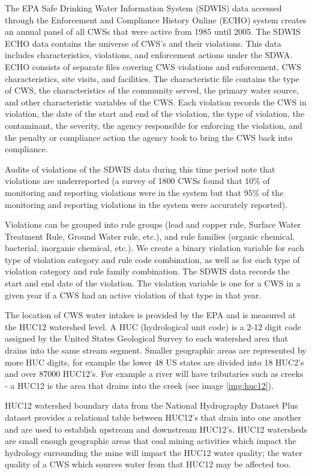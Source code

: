 \documentclass{article}
\begin{document}
The EPA Safe Drinking Water Information System (SDWIS) data accessed through the Enforcement and Compliance History Online (ECHO) system creates an annual panel of all CWSs that were active from 1985 until 2005. The SDWIS ECHO data contains the universe of CWS's and their violations. This data includes characteristics, violations, and enforcement actions under the SDWA. ECHO consists of separate files covering CWS violations and enforcement, CWS characteristics, site visits, and facilities. The characteristic file contains the type of CWS, the characteristics of the community served, the primary water source, and other characteristic variables of the CWS. Each violation records the CWS in violation, the date of the start and end of the violation, the type of violation, the contaminant, the severity, the agency responsible for enforcing the violation, and the penalty or compliance action the agency took to bring the CWS back into compliance.

Audits of violations of the SDWIS data during this time period note that violations are underreported (a survey of 1800 CWSs found that 10\% of monitoring and reporting violations were in the system but that 95\% of the monitoring and reporting violations in the system were accurately reported).

Violations can be grouped into rule groups (lead and copper rule, Surface Water Treatment Rule, Ground Water rule, etc.), and rule families (organic chemical, bacterial, inorganic chemical, etc.). We create a binary violation variable for each type of violation category and rule code combination, as well as for each type of violation category and rule family combination. The SDWIS data records the start and end date of the violation. The violation variable is one for a CWS in a given year if a CWS had an active violation of that type in that year. 

The location of CWS water intakes is provided by the EPA and is measured at the HUC12 watershed level. A HUC (hydrological unit code) is a 2-12 digit code assigned by the United States Geological Survey to each watershed area that drains into the same stream segment. Smaller geographic areas are represented by more HUC digits, for example the lower 48 US states are divided into 18 HUC2's and over 87000 HUC12's. For example a river will have tributaries such as creeks - a HUC12 is the area that drains into the creek (see image \ref{img:huc12}). 

HUC12 watershed boundary data from the National Hydrography Dataset Plus dataset provides a relational table between HUC12's that drain into one another and are used to establish upstream and downstream HUC12's. HUC12 watersheds are small enough geographic areas that coal mining activities which impact the hydrology surrounding the mine will impact the HUC12 water quality; the water quality of a CWS which sources water from that HUC12 may be affected too. 
\end{document}
